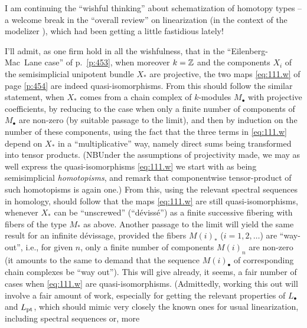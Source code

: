 \bigbreak

\noindent\hfill{}\par

\label{sec:112}%
I am continuing the ``wishful thinking'' about schematization of
homotopy types -- a welcome break in the ``overall review'' on
linearization (in the context of the modelizer \Cat), which had been
getting a little fastidious lately!

I'll admit, as one firm hold in all the wishfulness, that in the
``Eilenberg-Mac~Lane case'' of p.~\ref{p:453}, when moreover $k={\mathbb{Z}}$
and the components $X_i$ of the semisimplicial unipotent bundle $X_*$
are projective, the two maps \eqref{eq:111.w} of page \ref{p:454} are
indeed quasi-isomorphisms. From this should follow the similar
statement, when $X_*$ comes from a chain complex of $k$-modules
$M_\bullet$ with projective coefficients, by reducing to the case when
only a finite number of components of $M_\bullet$ are non-zero (by
suitable passage to the limit), and then by induction on the number of
these components, using the fact that the three terms in
\eqref{eq:111.w} depend on $X_*$ in a ``multiplicative'' way, namely
direct sums being transformed into tensor products. (NB\enspace Under
the assumptions of projectivity made, we may as well express the
quasi-isomorphisms \eqref{eq:111.w} we start with as being
semisimplicial \emph{homotopisms}, and remark that componentwise
tensor-product of such homotopisms is again one.) From this, using the
relevant spectral sequences in homology, should follow that the maps
\eqref{eq:111.w} are still quasi-isomorphisms, whenever $X_*$ can be
``unscrewed'' (``dévissé'') as a finite successive fibering with
fibers of the type $M_*$ as above. Another passage to the limit will
yield the same result for an infinite dévissage, provided the fibers
$M(i)_*$ ($i=1,2,\ldots$) are ``way-out'', i.e., for given $n$, only a
finite number of components $M(i)_n$ are non-zero (it amounts to the
same to demand that the sequence $M(i)_\bullet$ of corresponding chain
complexes be ``way out''). This will give already, it seems, a fair
number of cases when \eqref{eq:111.w} are
quasi-isomorphisms. (Admittedly, working this out will involve a fair
amount of work, especially for getting the relevant properties of
$L_\bullet$ and $L_{\mathrm{pt}}$, which should mimic very closely the known
ones for usual linearization, including spectral sequences or, more
